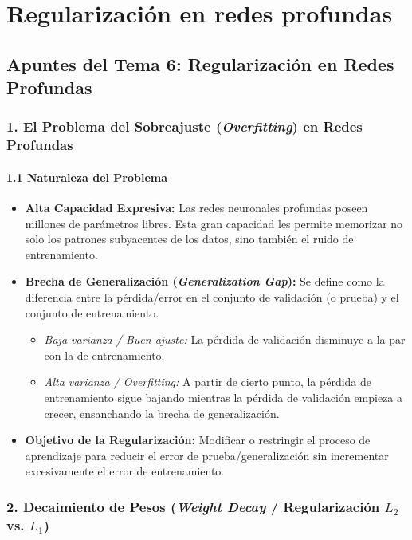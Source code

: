\chapter{Regularización en redes profundas}
\section{Apuntes del Tema 6: Regularización en Redes Profundas}

\subsection{1. El Problema del Sobreajuste (\emph{Overfitting}) en Redes Profundas}

\subsubsection{1.1 Naturaleza del Problema}

\begin{itemize}
	\item \textbf{Alta Capacidad Expresiva:} Las redes neuronales profundas poseen millones de parámetros libres. Esta gran capacidad les permite memorizar no solo los patrones subyacentes de los datos, sino también el ruido de entrenamiento.
	
	\item \textbf{Brecha de Generalización (\emph{Generalization Gap}):} Se define como la diferencia entre la pérdida/error en el conjunto de validación (o prueba) y el conjunto de entrenamiento.
	\begin{itemize}
		\item \emph{Baja varianza / Buen ajuste:} La pérdida de validación disminuye a la par con la de entrenamiento.
		\item \emph{Alta varianza / Overfitting:} A partir de cierto punto, la pérdida de entrenamiento sigue bajando mientras la pérdida de validación empieza a crecer, ensanchando la brecha de generalización.
	\end{itemize}
	
	\item \textbf{Objetivo de la Regularización:} Modificar o restringir el proceso de aprendizaje para reducir el error de prueba/generalización sin incrementar excesivamente el error de entrenamiento.
\end{itemize}

\subsection{2. Decaimiento de Pesos (\emph{Weight Decay} / Regularización $L_2$ vs. $L_1$)}

